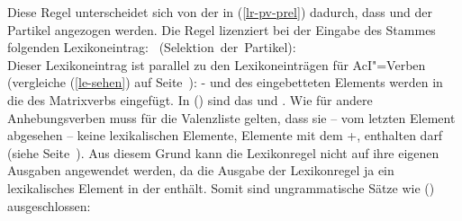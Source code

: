 \noindent
Diese Regel unterscheidet sich von der in (\ref{lr-pv-prel}) dadurch, dass \subj und \comps
der Partikel angezogen werden. Die Regel lizenziert bei der Eingabe des Stammes  
folgenden Lexikoneintrag:
\newsavebox{\boxxcompargat}
%
\eas
\label{le-lach-+particle}
\mbox{ (Selektion der Partikel):}\\
\zs
Dieser Lexikoneintrag ist parallel zu den Lexikoneinträgen für AcI"=Verben (vergleiche (\ref{le-sehen})
auf Seite~\pageref{le-sehen}): \subj- und \compsw des eingebetteten Elements werden in die
\compsl des Matrixverbs eingefügt. In () sind das  und .
Wie für andere Anhebungsverben muss für die Valenzliste gelten, dass sie -- vom letzten Element abgesehen
-- keine lexikalischen Elemente, \dash Elemente mit dem \lexw +, enthalten darf (siehe Seite~\pageref{constr-non-complex-forming}).
Aus diesem Grund kann die Lexikonregel nicht auf ihre eigenen Ausgaben angewendet werden,
da die Ausgabe der Lexikonregel ja ein lexikalisches Element in der \compsl enthält.
Somit sind ungrammatische Sätze wie () ausgeschlossen:
\z

